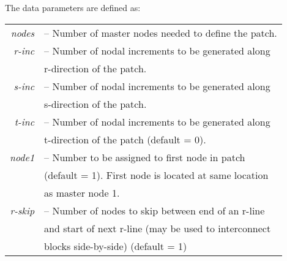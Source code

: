 The data parameters are defined as:

\begin{center}
\begin{tabular}{rl}
\it nodes &-- Number of master nodes needed to define the patch. \\
\it r-inc &-- Number of nodal increments to be generated along \\
          &\quad r-direction of the patch. \\
\it s-inc &-- Number of nodal increments to be generated along \\
          &\quad s-direction of the patch. \\
\it t-inc &-- Number of nodal increments to be generated along \\
          &\quad t-direction of the patch (default = 0). \\
\it node1 &-- Number to be assigned to first node in patch \\
          &\quad (default = 1).  First node is located at same location \\
          &\quad as master node 1. \\
\it r-skip&-- Number of nodes to skip between end of an r-line \\
          &\quad and start of next r-line (may be used to interconnect \\
          &\quad blocks side-by-side) (default = 1)
\end{tabular}
\end{center}
\vfill\eject

